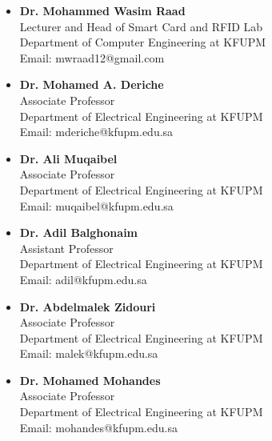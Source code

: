 \documentclass[11pt,a4paper,sans]{moderncv}        %
\begin{document}
\vspace{6pt}
\begin{multicols}{2} 
\begin{itemize}

\item \textbf{Dr. Mohammed Wasim Raad} \\ Lecturer and Head of Smart Card and RFID Lab \\  Department of Computer Engineering at KFUPM\\ Email: mwraad12@gmail.com

\vspace{6pt}

\item \textbf{Dr. Mohamed A. Deriche} \\ Associate Professor \\  Department of Electrical Engineering at KFUPM\\ Email: mderiche@kfupm.edu.sa

\vspace{6pt}

\item \textbf{Dr. Ali Muqaibel} \\  Associate Professor \\   Department of Electrical Engineering at KFUPM \\ Email: muqaibel@kfupm.edu.sa

\vspace{6pt}

\item \textbf{Dr. Adil Balghonaim} \\  Assistant Professor \\   Department of Electrical Engineering at KFUPM \\ Email: adil@kfupm.edu.sa

\vspace{6pt}

\item \textbf{Dr. Abdelmalek Zidouri} \\  Associate Professor \\   Department of Electrical Engineering at KFUPM \\ Email: malek@kfupm.edu.sa

\vspace{6pt}

\item \textbf{Dr. Mohamed Mohandes} \\  Associate Professor \\   Department of Electrical Engineering at KFUPM \\ Email: mohandes@kfupm.edu.sa


\end{itemize}

\end{multicols}
\end{document}
